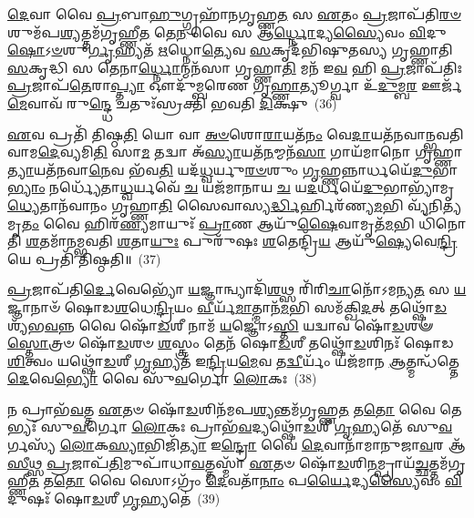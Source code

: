 {\anuvakamend[{\-\ul{𑌦}\-\-\ul{𑌭𑍍𑌨𑍋}\-𑌤𑍍𑌯𑌨᳴𑌭𑌿𑌷𑍁𑌤𑌸𑍍𑌯 𑌗𑍃\-\ul{𑌹𑍍𑌣𑌾}\-𑌤𑍍𑌯𑍇\-\ul{𑌕𑌾}\-𑌨𑍍𑌨𑌵𑌿𑍞᳴\-\ul{𑌶}\-𑌤𑌿𑌶𑍍𑌚᳴}]}%

\-\ul{𑌦𑍇}\-𑌵𑌾 𑌵𑍈 \ul{𑌪𑍍𑌰}\-𑌬𑌾\-\ul{𑌹𑍁}\-𑌗𑍍𑌗𑍍𑌰𑌹𑌾᳴𑌨𑌗𑍃𑌹𑍍𑌣\-\ul{𑌤} 𑌸 \ul{𑌏}\-𑌤𑌂 \ul{𑌪𑍍𑌰}\-𑌜𑌾𑌪᳴𑌤𑌿\-\ul{𑌰}\-\-\ul{𑍞}\-𑌶𑍁𑌮᳴𑌪\-\ul{𑌶𑍍𑌯}\-𑌤𑍍𑌤𑌮᳴𑌗𑍃𑌹𑍍𑌣𑍀\-\ul{𑌤} 𑌤𑍇\-\ul{𑌨} 𑌵𑍈 𑌸 𑌆॑\-\ul{𑌰𑍍𑌧𑍍𑌨𑍋}\-𑌦𑍍𑌯\-\ul{𑌸𑍍𑌯𑍈}\-𑌵𑌂 \ul{𑌵𑌿}\-𑌦𑍁\-\ul{𑌷𑍋}\-\-𑌽\-\ul{𑍞}\-𑌶𑍁\-\ul{𑌰𑍍𑌗𑍃}\-𑌹𑍍𑌯𑌤᳴ \ul{𑌋}\-𑌧𑍍𑌨𑍋\-\ul{𑌤𑍍𑌯𑍇}\-𑌵 \ul{𑌸}\-𑌕𑍃𑌦᳴𑌭𑌿𑌷𑍁𑌤𑌸𑍍𑌯 𑌗𑍃𑌹𑍍𑌣𑌾𑌤𑌿 \ul{𑌸}\-𑌕𑍃𑌦𑍍𑌧𑌿 𑌸 𑌤𑍇𑌨𑌾\-\ul{𑌰𑍍𑌧𑍍𑌨𑍋}\-𑌨𑍍𑌮𑌨᳴𑌸𑌾 𑌗𑍃𑌹𑍍𑌣𑌾\-\ul{𑌤𑌿} 𑌮𑌨᳴ 𑌇\-\ul{𑌵} 𑌹𑌿 \ul{𑌪𑍍𑌰}\-𑌜𑌾𑌪᳴𑌤𑌿𑌃 \ul{𑌪𑍍𑌰}\-𑌜𑌾𑌪᳴\-\ul{𑌤𑍇}\-𑌰𑌾\-\ul{𑌪𑍍𑌤𑍍𑌯𑌾} 𑌔𑌦𑍁᳴𑌮𑍍𑌬𑌰𑍇𑌣 𑌗𑍃\-\ul{𑌹𑍍𑌣𑌾}\-𑌤𑍍𑌯𑍂𑌰𑍍𑌗𑍍𑌵𑌾 𑌉᳴\-\ul{𑌦𑍁}\-𑌮𑍍𑌬\-\ul{𑌰} 𑌊𑌰𑍍𑌜᳴\-\ul{𑌮𑍇}\-𑌵𑌾𑌵᳴ 𑌰𑍁\-\ul{𑌨𑍍𑌦𑍍𑌧𑍇} 𑌚𑌤𑍁𑌃᳴𑌸𑍍𑌰𑌕𑍍𑌤𑌿 𑌭𑌵𑌤𑌿 \ul{𑌦𑌿}\-𑌕𑍍𑌷𑍁~(36)

\-\ul{𑌏}\-𑌵 𑌪𑍍𑌰𑌤𑌿᳴ 𑌤𑌿𑌷𑍍𑌠\-\ul{𑌤𑌿} 𑌯𑍋 𑌵𑌾 \ul{𑌅}\-\-\ul{𑍞}\-𑌶𑍋\-\ul{𑌰𑌾}\-𑌯𑌤᳴\-\ul{𑌨𑌂} 𑌵𑍇\-\ul{𑌦𑌾}\-𑌯𑌤᳴𑌨𑌵𑌾𑌨𑍍𑌭𑌵𑌤𑌿 𑌵𑌾𑌮\-\ul{𑌦𑍇}\-𑌵𑍍𑌯𑌮𑌿\-\ul{𑌤𑌿} 𑌸𑌾\-\ul{𑌮} 𑌤𑌦𑍍𑌵𑌾 𑌅᳴\-\ul{𑌸𑍍𑌯𑌾}\-𑌯𑌤᳴\-\ul{𑌨}\-𑌮𑍍𑌮𑌨᳴\-\ul{𑌸𑌾} 𑌗𑌾𑌯᳴𑌮𑌾𑌨𑍋 𑌗𑍃𑌹𑍍𑌣𑌾\-\ul{𑌤𑍍𑌯𑌾}\-𑌯𑌤᳴𑌨𑌵𑌾\-\ul{𑌨𑍇}\-𑌵 𑌭᳴𑌵\-\ul{𑌤𑌿} 𑌯𑌦᳴\-\ul{𑌧𑍍𑌵}\-𑌰𑍍𑌯𑍁\-\ul{𑌰}\-\-\ul{𑍞}\-𑌶𑍁𑌂 \ul{𑌗𑍃}\-𑌹𑍍𑌣𑌨𑍍𑌨𑌾𑌰𑍍𑌧𑌯𑍇᳴\-\ul{𑌦𑍁}\-𑌭𑌾\-\ul{𑌭𑍍𑌯𑌾𑌂} 𑌨𑌰𑍍𑌧𑍍𑌯𑍇᳴𑌤𑌾\-\ul{𑌧𑍍𑌵}\-𑌰𑍍𑌯𑌵𑍇᳴ \ul{𑌚} 𑌯𑌜᳴𑌮𑌾𑌨𑌾𑌯 \ul{𑌚} 𑌯\-\ul{𑌦}\-𑌰𑍍𑌧𑌯𑍇᳴\-\ul{𑌦𑍁}\-𑌭𑌾𑌭𑍍𑌯𑌾᳴𑌮𑍃\-\ul{𑌧𑍍𑌯𑍇}\-𑌤𑌾𑌨᳴𑌵𑌾𑌨𑌂 𑌗𑍃𑌹𑍍𑌣𑌾\-\ul{𑌤𑌿} 𑌸𑍈𑌵𑌾𑌸𑍍𑌯\-\ul{𑌰𑍍𑌦𑍍𑌧𑌿}\-𑌰𑍍\mbox{}𑌹𑌿𑌰᳴𑌣𑍍𑌯\-\ul{𑌮}\-𑌭𑌿 𑌵𑍍𑌯᳴𑌨𑌿\-\ul{𑌤𑍍𑌯}\-𑌮𑍃\-\ul{𑌤𑌂} 𑌵𑍈 𑌹𑌿𑌰᳴\-\ul{𑌣𑍍𑌯}\-𑌮𑌾𑌯𑍁𑌃᳴ \ul{𑌪𑍍𑌰𑌾}\-𑌣 𑌆𑌯𑍁᳴\-\ul{𑌷𑍈}\-𑌵𑌾𑌮𑍃𑌤᳴\-\ul{𑌮}\-𑌭𑌿 𑌧𑌿᳴𑌨𑍋𑌤𑌿 \ul{𑌶}\-𑌤𑌮𑌾᳴𑌨𑌮𑍍𑌭𑌵𑌤𑌿 \ul{𑌶}\-𑌤𑌾\-\ul{𑌯𑍁𑌃} 𑌪𑍁𑌰𑍁᳴𑌷𑌃 \ul{𑌶}\-𑌤𑍇𑌨𑍍𑌦𑍍𑌰𑌿᳴\-\ul{𑌯} 𑌆𑌯𑍁᳴\-\ul{𑌷𑍍𑌯𑍇}\-𑌵𑍇\-\ul{𑌨𑍍𑌦𑍍𑌰𑌿}\-𑌯𑍇 𑌪𑍍𑌰𑌤𑌿᳴ 𑌤𑌿𑌷𑍍𑌠𑌤𑌿॥~(37)

{\anuvakamend[{\-\ul{𑌦𑌿}\-𑌕𑍍𑌷𑍍𑌵᳴𑌨𑌿𑌤𑌿 𑌵𑌿𑍞\-\ul{𑌶}\-𑌤𑌿𑌶𑍍𑌚᳴}]}%

\-\ul{𑌪𑍍𑌰}\-𑌜𑌾𑌪᳴𑌤𑌿\-\ul{𑌰𑍍𑌦𑍇}\-𑌵𑍇𑌭𑍍𑌯𑍋᳴ \ul{𑌯}\-𑌜𑍍𑌞𑌾𑌨𑍍𑌵𑍍𑌯𑌾𑌦𑌿᳴\-\ul{𑌶}\-𑌥𑍍𑌸 𑌰𑌿᳴𑌰𑌿\-\ul{𑌚𑌾}\-𑌨𑍋᳴\-𑌽𑌮𑌨𑍍𑌯\-\ul{𑌤} 𑌸 \ul{𑌯}\-𑌜𑍍𑌞𑌾𑌨𑌾𑍞᳴ 𑌷𑍋𑌡\-\ul{𑌶}\-𑌧𑍇\-\ul{𑌨𑍍𑌦𑍍𑌰𑌿}\-𑌯𑌂 \ul{𑌵𑍀}\-𑌰𑍍𑌯᳴\-\ul{𑌮𑌾}\-𑌤𑍍𑌮𑌾𑌨᳴\-\ul{𑌮}\-𑌭𑌿 𑌸𑌮᳴𑌕𑍍𑌖𑌿\-\ul{𑌦}\-𑌤𑍍 𑌤𑌥𑍍𑌷𑍋᳴\-\ul{𑌡}\-𑌶𑍍𑌯᳴𑌭\-\ul{𑌵}\-𑌨𑍍𑌨 𑌵𑍈 𑌷𑍋᳴\-\ul{𑌡}\-𑌶𑍀 𑌨𑌾𑌮᳴ \ul{𑌯}\-𑌜𑍍𑌞𑍋॑\-𑌽\-\ul{𑌸𑍍𑌤𑌿} 𑌯𑌦𑍍𑌵𑌾𑌵 𑌷𑍋᳴\-\ul{𑌡}\-𑌶𑍟 \ul{𑌸𑍍𑌤𑍋}\-𑌤𑍍𑌰𑍞 𑌷𑍋᳴\-\ul{𑌡}\-𑌶𑍞 \ul{𑌶}\-𑌸𑍍𑌤𑍍𑌰𑌂 𑌤𑍇𑌨᳴ 𑌷𑍋\-\ul{𑌡}\-𑌶𑍀 𑌤𑌥𑍍𑌷𑍋᳴\-\ul{𑌡}\-𑌶𑌿𑌨𑌃᳴ 𑌷𑍋𑌡\-\ul{𑌶𑌿}\-𑌤𑍍𑌵𑌂 𑌯𑌥𑍍𑌷𑍋᳴\-\ul{𑌡}\-𑌶𑍀 \ul{𑌗𑍃}\-𑌹𑍍𑌯𑌤᳴ 𑌇\-\ul{𑌨𑍍𑌦𑍍𑌰𑌿}\-𑌯\-\ul{𑌮𑍇}\-𑌵 𑌤\-\ul{𑌦𑍍𑌵𑍀}\-𑌰𑍍𑌯𑌂᳴ 𑌯𑌜᳴𑌮𑌾𑌨 \ul{𑌆}\-𑌤𑍍𑌮𑌨𑍍𑌧᳴𑌤𑍍𑌤𑍇 \ul{𑌦𑍇}\-𑌵𑍇\-\ul{𑌭𑍍𑌯𑍋} 𑌵𑍈 𑌸𑍁᳴\-\ul{𑌵}\-𑌰𑍍𑌗𑍋 \ul{𑌲𑍋}\-𑌕𑌃~(38)

𑌨 𑌪𑍍𑌰𑌾𑌭᳴\-\ul{𑌵}\-𑌤𑍍𑌤 \ul{𑌏}\-𑌤𑍞 𑌷𑍋᳴\-\ul{𑌡}\-𑌶𑌿𑌨᳴𑌮𑌪\-\ul{𑌶𑍍𑌯}\-𑌨𑍍𑌤𑌮᳴𑌗𑍃𑌹𑍍𑌣\-\ul{𑌤} 𑌤\-\ul{𑌤𑍋} 𑌵𑍈 𑌤𑍇𑌭𑍍𑌯𑌃᳴ 𑌸𑍁\-\ul{𑌵}\-𑌰𑍍𑌗𑍋 \ul{𑌲𑍋}\-𑌕𑌃 𑌪𑍍𑌰𑌾𑌭᳴\-\ul{𑌵}\-𑌦𑍍𑌯𑌥𑍍𑌷𑍋᳴\-\ul{𑌡}\-𑌶𑍀 \ul{𑌗𑍃}\-𑌹𑍍𑌯𑌤𑍇᳴ 𑌸𑍁\-\ul{𑌵}\-𑌰𑍍𑌗𑌸𑍍𑌯᳴ \ul{𑌲𑍋}\-𑌕\-\ul{𑌸𑍍𑌯𑌾}\-𑌭𑌿𑌜𑌿᳴\-\ul{𑌤𑍍𑌯𑌾} 𑌇\-\ul{𑌨𑍍𑌦𑍍𑌰𑍋} 𑌵𑍈 \ul{𑌦𑍇}\-𑌵𑌾𑌨𑌾᳴𑌮𑌾𑌨𑍁𑌜𑌾\-\ul{𑌵}\-𑌰 𑌆᳴\-\ul{𑌸𑍀}\-𑌥𑍍𑌸 \ul{𑌪𑍍𑌰}\-𑌜𑌾𑌪᳴\-\ul{𑌤𑌿}\-𑌮𑍁𑌪𑌾᳴𑌧𑌾\-\ul{𑌵}\-𑌤𑍍𑌤𑌸𑍍𑌮𑌾᳴ \ul{𑌏}\-𑌤𑍞 𑌷𑍋᳴\-\ul{𑌡}\-𑌶𑌿\-\ul{𑌨}\-𑌮𑍍𑌪𑍍𑌰𑌾𑌯᳴\-\ul{𑌚𑍍𑌛}\-𑌤𑍍𑌤𑌮᳴𑌗𑍃𑌹𑍍𑌣𑍀\-\ul{𑌤} 𑌤\-\ul{𑌤𑍋} 𑌵𑍈 𑌸𑍋\-𑌽𑌗𑍍𑌰𑌂᳴ \ul{𑌦𑍇}\-𑌵𑌤𑌾᳴\-\ul{𑌨𑌾𑌂} 𑌪\-\ul{𑌰𑍍𑌯𑍈}\-𑌦𑍍𑌯\-\ul{𑌸𑍍𑌯𑍈}\-𑌵𑌂 \ul{𑌵𑌿}\-𑌦𑍁𑌷𑌃᳴ 𑌷𑍋\-\ul{𑌡}\-𑌶𑍀 \ul{𑌗𑍃}\-𑌹𑍍𑌯𑌤𑍇॑~(39)

